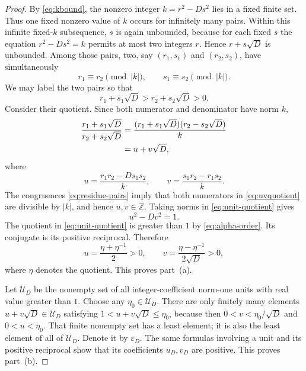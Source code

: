 \documentclass[a4paper,11pt]{amsart}
\numberwithin{equation}{section}
\theoremstyle{definition}
\theoremstyle{remark}
\newcommand{\Z}{\mathbb Z}
\newcommand{\eps}{\varepsilon}
\begin{document}
\begin{proof}
By \eqref{eq:kbound}, the nonzero integer \(k=r^2-Ds^2\) lies in a fixed
finite set.  Thus one fixed nonzero value of \(k\) occurs for infinitely many
pairs.  Within this infinite fixed-\(k\) subsequence, \(s\) is again unbounded,
because for each fixed \(s\) the equation \(r^2-Ds^2=k\) permits at most two
integers \(r\).  Hence \(r+s\sqrt D\) is unbounded.  Among those pairs, two,
say \((r_1,s_1)\) and \((r_2,s_2)\), have simultaneously
\begin{equation}\label{eq:residue-pairs}
 r_1\equiv r_2\pmod{|k|},
 \qquad
 s_1\equiv s_2\pmod{|k|}.
\end{equation}
We may label the two pairs so that
\begin{equation}\label{eq:alpha-order}
 r_1+s_1\sqrt D>r_2+s_2\sqrt D>0.
\end{equation}
Consider their quotient.  Since both numerator and denominator have norm
\(k\),
\begin{align}\label{eq:unit-quotient}
 \frac{r_1+s_1\sqrt D}{r_2+s_2\sqrt D}
 &=\frac{(r_1+s_1\sqrt D)(r_2-s_2\sqrt D)}{k}\notag\\
 &=u+v\sqrt D,
\end{align}
where
\begin{equation}\label{eq:uvquotient}
 u=\frac{r_1r_2-Ds_1s_2}{k},
 \qquad
 v=\frac{s_1r_2-r_1s_2}{k}.
\end{equation}
The congruences \eqref{eq:residue-pairs} imply that both numerators in
\eqref{eq:uvquotient} are divisible by \(|k|\), and hence \(u,v\in\Z\).
Taking norms in \eqref{eq:unit-quotient} gives
\begin{equation*}
 u^2-Dv^2=1.
\end{equation*}
The quotient in \eqref{eq:unit-quotient} is greater than \(1\) by
\eqref{eq:alpha-order}.  Its conjugate is its positive reciprocal.  Therefore
\begin{equation*}
 u=\frac{\eta+\eta^{-1}}2>0,
 \qquad
 v=\frac{\eta-\eta^{-1}}{2\sqrt D}>0,
\end{equation*}
where \(\eta\) denotes the quotient.  This proves part~\textup{(a)}.

Let \(\mathcal U_D\) be the nonempty set of all integer-coefficient
norm-one units with real value greater than \(1\).  Choose any
\(\eta_0\in\mathcal U_D\).  There are only finitely many elements
\(u+v\sqrt D\in\mathcal U_D\) satisfying
\(1<u+v\sqrt D\leq\eta_0\), because then \(0<v<\eta_0/\sqrt D\) and
\(0<u<\eta_0\).  That finite nonempty set has a least element; it is also the
least element of all of \(\mathcal U_D\).  Denote it by \(\eps_D\).  The
same formulas involving a unit and its positive reciprocal show that its
coefficients \(u_D,v_D\) are positive.  This proves part~\textup{(b)}.


\end{proof}
\end{document}
